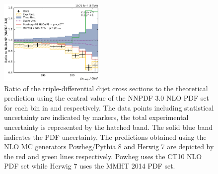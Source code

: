 \begin{figure}[htbp]
    \includegraphics[width=0.45\textwidth]{figures/measurement/ratio_to_NNPDF30+np_varcomp_yb2ys0.pdf}
    \caption[Ratio of measured cross sections to predictions using different MC event
    generators]{
    Ratio of the triple-differential dijet cross sections to the theoretical
    prediction using the central value of the NNPDF 3.0 NLO PDF set for each bin in \ystar
    and \yboost respectively. The data points including statistical uncertainty are
    indicated by markers, the total experimental uncertainty is represented by the
    hatched band. The solid blue band indicates the PDF uncertainty. The
    predictions obtained using the NLO MC generators Powheg/Pythia 8 and Herwig 7
    are depicted by the red and green lines respectively. Powheg uses the CT10
    NLO PDF set while Herwig 7 uses the MMHT 2014 PDF set.}
    \label{fig:ratio_nnpdf30_mccomp_nlo}
\end{figure}



